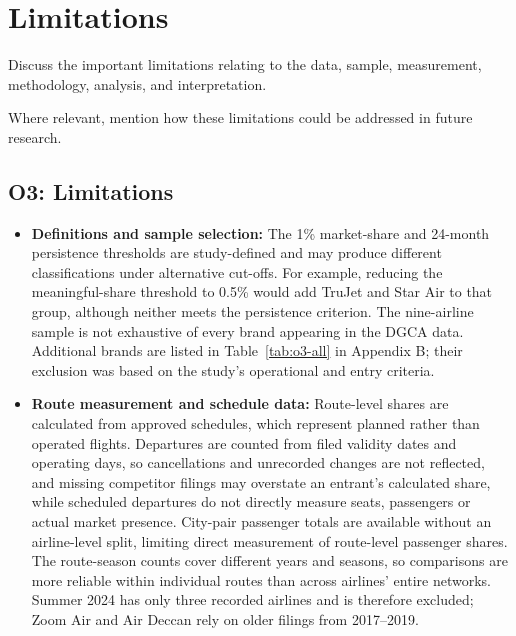 \documentclass[12pt,a4paper]{article}
\newenvironment{o3box}{\ifthenelse{\boolean{o3highlight}}{\begingroup\color{o3sky}}{}}{\ifthenelse{\boolean{o3highlight}}{\endgroup}{}}
\begin{document}
\section{Limitations}
Discuss the important limitations relating to the data, sample, measurement, methodology, analysis, and interpretation.

Where relevant, mention how these limitations could be addressed in future research.

\begin{o3box}
\subsection{O3: Limitations}

\begin{itemize}
    \item \textbf{Definitions and sample selection:} The 1\% market-share and 24-month persistence thresholds are study-defined and may produce different classifications under alternative cut-offs. For example, reducing the meaningful-share threshold to 0.5\% would add TruJet and Star Air to that group, although neither meets the persistence criterion. The nine-airline sample is not exhaustive of every brand appearing in the DGCA data. Additional brands are listed in Table~\ref{tab:o3-all} in Appendix B; their exclusion was based on the study's operational and entry criteria.

    \item \textbf{Route measurement and schedule data:} Route-level shares are calculated from approved schedules, which represent planned rather than operated flights. Departures are counted from filed validity dates and operating days, so cancellations and unrecorded changes are not reflected, and missing competitor filings may overstate an entrant's calculated share, while scheduled departures do not directly measure seats, passengers or actual market presence. City-pair passenger totals are available without an airline-level split, limiting direct measurement of route-level passenger shares. The route-season counts cover different years and seasons, so comparisons are more reliable within individual routes than across airlines' entire networks. Summer 2024 has only three recorded airlines and is therefore excluded; Zoom Air and Air Deccan rely on older filings from 2017--2019.


\end{itemize}
\end{o3box}
\end{document}
